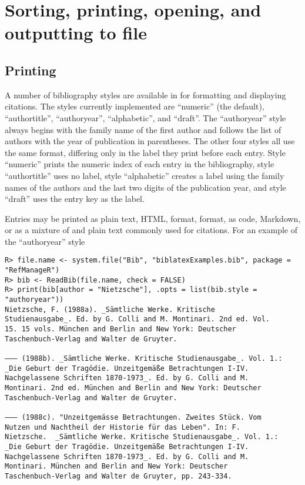 \documentclass[article]{jss}\usepackage[]{graphicx}\usepackage[]{color}
\makeatletter
\newenvironment{kframe}{%
 \def\at@end@of@kframe{}%
 \ifinner\ifhmode%
  \def\at@end@of@kframe{\end{minipage}}%
  \begin{minipage}{\columnwidth}%
 \fi\fi%
 \def\FrameCommand##1{\hskip\@totalleftmargin \hskip-\fboxsep
 \colorbox{shadecolor}{##1}\hskip-\fboxsep
     \hskip-\linewidth \hskip-\@totalleftmargin \hskip\columnwidth}%
 \MakeFramed {\advance\hsize-\width
   \@totalleftmargin\z@ \linewidth\hsize
   \@setminipage}}%
 {\par\unskip\endMakeFramed%
 \at@end@of@kframe}
\newenvironment{knitrout}{}{} %
\newcommand{\ourpkg}{\pkg{RefManageR}}
\makeatother
\begin{document}
\section{Sorting, printing, opening, and outputting to file}\label{sec_print}
\subsection{Printing}
A number of \Biblatex{} bibliography styles are available in \ourpkg{} for formatting and displaying citations.  The styles currently implemented are ``numeric'' (the default), ``authortitle'', ``authoryear'', ``alphabetic'', and ``draft''.  The ``authoryear'' style always begins with the family name of the first author and follows the list of authors with the year of publication in parentheses.  The other four styles all use the same format, differing only in the label they print before each entry.  Style ``numeric'' prints the numeric index of each entry in the bibliography, style ``authortitle'' uses no label, style ``alphabetic'' creates a label using the family names of the authors and the last two digits of the publication year, and style ``draft'' uses the entry key as the label.

Entries may be printed as plain text, HTML, \Bibtex{} format, \Biblatex{} format, as \R{} code, Markdown, or as a mixture of \Bibtex{} and plain text commonly used for citations.  For an example of the ``authoryear'' style
\begin{knitrout}
\color{fgcolor}\begin{kframe}
\begin{verbatim}
R> file.name <- system.file("Bib", "biblatexExamples.bib", package = "RefManageR")
R> bib <- ReadBib(file.name, check = FALSE)
R> print(bib[author = "Nietzsche"], .opts = list(bib.style = "authoryear"))
Nietzsche, F. (1988a). _Sämtliche Werke. Kritische
Studienausgabe_. Ed. by G. Colli and M. Montinari. 2nd ed. Vol.
15. 15 vols. München and Berlin and New York: Deutscher
Taschenbuch-Verlag and Walter de Gruyter.

—–— (1988b). _Sämtliche Werke. Kritische Studienausgabe_. Vol. 1.:
_Die Geburt der Tragödie. Unzeitgemäße Betrachtungen I-IV.
Nachgelassene Schriften 1870-1973_. Ed. by G. Colli and M.
Montinari. 2nd ed. München and Berlin and New York: Deutscher
Taschenbuch-Verlag and Walter de Gruyter.

—–— (1988c). "Unzeitgemässe Betrachtungen. Zweites Stück. Vom
Nutzen und Nachtheil der Historie für das Leben". In: F.
Nietzsche.  _Sämtliche Werke. Kritische Studienausgabe_. Vol. 1.:
_Die Geburt der Tragödie. Unzeitgemäße Betrachtungen I-IV.
Nachgelassene Schriften 1870-1973_. Ed. by G. Colli and M.
Montinari. München and Berlin and New York: Deutscher
Taschenbuch-Verlag and Walter de Gruyter, pp. 243-334.
\end{verbatim}
\end{kframe}
\end{knitrout}
\end{document}
